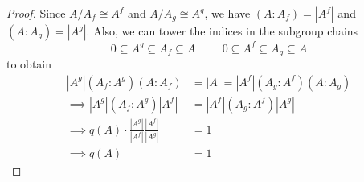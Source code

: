 \documentclass[10pt]{article}
\newcommand{\Z}{\mathbf{Z}}
\begin{document}
\begin{enumerate}
\begin{enumerate}
\begin{proof}
\begin{comment}
First, we will show the result for cyclic groups of prime order $p$, so let $A = \Z_p$.  In this case, the kernels of $f$ and $g$ completely determine their images, and conversely.  For instance, if $A_f$ is trivial, then $A^f = f(A) = \{0\}$.  This gives us the following table of possibilities for these indices, and the resulting value of $q(A)$:
\begin{center}
\renewcommand{\arraystretch}{1.2}
\begin{tabular}{|c|c|c|c|c|c|c|}
\hline 
$|A_f|$ & $|A^g|$ & $|A_g|$ & $|A^f|$ & $(A_f:A^g)$ & $(A_g:A^f)$ & $q(A)$ \\ 
\hline 
$p$ & $p$ & $0$ & $0$ & $1$ & $1$ & $1$ \\ 
\hline 
$p$ & $0$ & $p$ & $0$ & $p$ & $p$ & $1$ \\ 
\hline 
$0$ & $0$ & $p$ & $p$ & $1$ & $1$ & $1$ \\ 
\hline 
\end{tabular} 
\end{center}
So the result holds when $A$ is cyclic of prime order.

The general claim now follows by induction.  The result is trivial when $A = \{0\}$, so suppose it holds for all groups of order less than some $k$.  Then some prime $p$ divides the order of $A$, hence $A$ has a subgroup $B$ of order $p$.
\end{comment}

Since $A / A_f \cong A^f$ and $A / A_g \cong A^g$, we have $(A:A_f) = |A^f|$ and $(A:A_g) = |A^g|$.  Also, we can tower the indices in the subgroup chains
$$
0 \subseteq A^g \subseteq A_f \subseteq A
\hspace{1cm}
0 \subseteq A^f \subseteq A_g \subseteq A
$$
to obtain
\begin{align*}
|A^g|(A_f : A^g)(A:A_f) &= |A| = |A^f|(A_g : A^f)(A:A_g)
\\
\implies |A^g|(A_f : A^g)|A^f| &= |A^f|(A_g : A^f)|A^g|
\\
\implies
q(A) \cdot \frac{|A^g|}{|A^f|}\frac{|A^f|}{|A^g|} &= 1
\\
\implies q(A) &= 1
\end{align*}
\end{proof}

\end{enumerate}
\end{enumerate}
\end{document}
